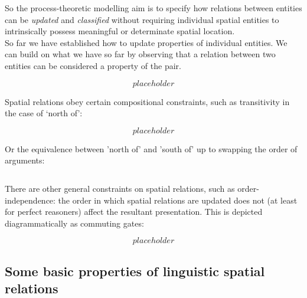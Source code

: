 So the process-theoretic modelling aim is to specify how relations between entities can be \emph{updated} and \emph{classified} without requiring individual spatial entities to intrinsically possess meaningful or determinate spatial location.\\

So far we have established how to update properties of individual entities. We can build on what we have so far by observing that a relation between two entities can be considered a property of the pair.

\[placeholder\]

Spatial relations obey certain compositional constraints, such as transitivity in the case of `north of':

\[placeholder\]

Or the equivalence between 'north of' and 'south of' up to swapping the order of arguments:

\[\]

There are other general constraints on spatial relations, such as order-independence: the order in which spatial relations are updated does not (at least for perfect reasoners) affect the resultant presentation. This is depicted diagrammatically as commuting gates:

\[placeholder\]

\subsection{Some basic properties of linguistic spatial relations}